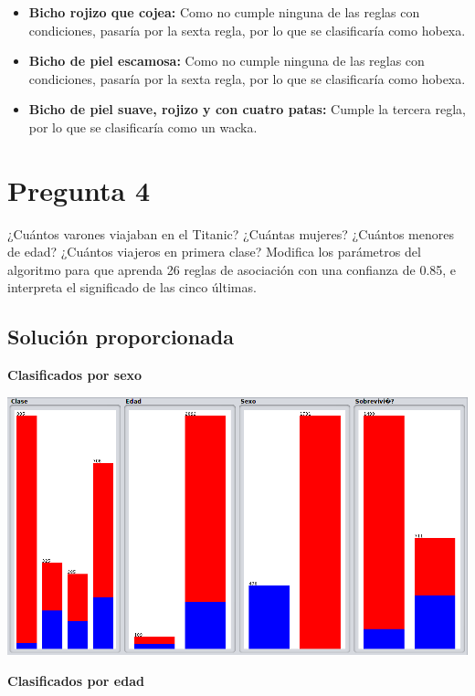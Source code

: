 \documentclass{article}
\begin{document}
\begin{itemize}
\item \textbf{Bicho rojizo que cojea:} Como no cumple ninguna de las reglas con condiciones, pasaría por la sexta regla, por lo que se clasificaría como hobexa.
\item \textbf{Bicho de piel escamosa:} Como no cumple ninguna de las reglas con condiciones, pasaría por la sexta regla, por lo que se clasificaría como hobexa.
\item \textbf{Bicho de piel suave, rojizo y con cuatro patas:} Cumple la tercera regla, por lo que se clasificaría como un wacka.
\end{itemize}

\section{Pregunta 4}

¿Cuántos varones viajaban en el Titanic? ¿Cuántas mujeres? ¿Cuántos menores de edad? ¿Cuántos
viajeros en primera clase? Modifica los parámetros del algoritmo para que aprenda 26 reglas de asociación con una confianza de 0.85, e interpreta el significado de las cinco últimas.

\subsection{Solución proporcionada}

\textbf{Clasificados por sexo}

\begin{center}
\includegraphics[scale=0.3]{images/sexo.png}
\end{center}

\textbf{Clasificados por edad}
\end{document}
